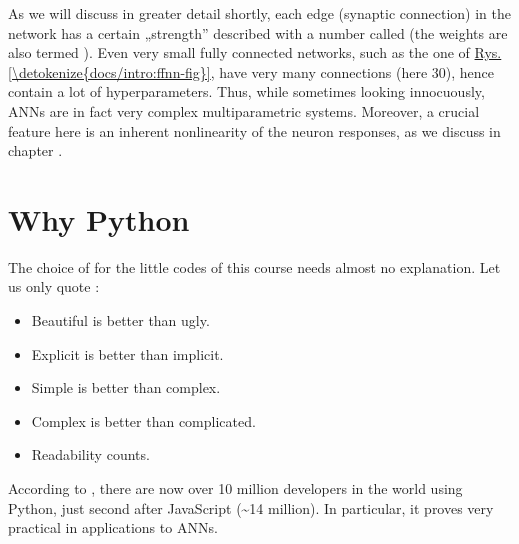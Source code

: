 \documentclass[a4paper,12pt,polish]{jupyterBook}
\begin{document}
\sphinxAtStartPar
As we will discuss in greater detail shortly, each edge (synaptic connection) in the network has a certain „strength” described with a number called  (the weights are also termed ). Even very small fully connected networks, such as the one of \hyperref[\detokenize{docs/intro:ffnn-fig}]{Rys.\@ \ref{\detokenize{docs/intro:ffnn-fig}}}, have very many connections (here 30), hence contain a lot of hyperparameters. Thus, while sometimes looking innocuously, ANNs are in fact very complex multi\sphinxhyphen{}parametric systems. Moreover, a crucial feature here is an inherent nonlinearity of the neuron responses, as we discuss in chapter {\hyperref[\detokenize{docs/mcp:mcp-lab}]{}}.


\section{Why Python}
\label{\detokenize{docs/intro:why-python}}
\sphinxAtStartPar
The choice of   for the little codes of this course needs almost no explanation. Let us only quote :
\begin{itemize}
\item {} 
\sphinxAtStartPar
Beautiful is better than ugly.

\item {} 
\sphinxAtStartPar
Explicit is better than implicit.

\item {} 
\sphinxAtStartPar
Simple is better than complex.

\item {} 
\sphinxAtStartPar
Complex is better than complicated.

\item {} 
\sphinxAtStartPar
Readability counts.

\end{itemize}

\sphinxAtStartPar
According to , there are now over 10 million developers in the world using Python, just second after JavaScript (\textasciitilde{}14 million). In particular, it proves very practical in applications to ANNs.
\end{document}
